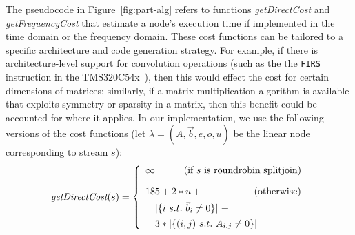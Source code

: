 The pseudocode in Figure~\ref{fig:part-alg} refers to functions {\it
getDirectCost} and {\it getFrequencyCost} that estimate a node's
execution time if implemented in the time domain or the frequency
domain.  These cost functions can be tailored to a specific
architecture and code generation strategy.  For example, if there is
architecture-level support for convolution operations (such as the the
{\tt FIRS} instruction in the TMS320C54x~\cite{ti-dsp-manual}), then
this would effect the cost for certain dimensions of matrices;
similarly, if a matrix multiplication algorithm is available that
exploits symmetry or sparsity in a matrix, then this benefit could be
accounted for where it applies.  In our implementation, we use the
following versions of the cost functions (let
$\lambda=(A,\vec{b},e,o,u)$ be the linear node corresponding to stream
$s$):
\[
\mt{getDirectCost}(s) = \left\{ \begin{array}{l}
\infty ~~~~~~~~~ \mbox{(if }s\mbox{~is roundrobin splitjoin)} \\ ~ \\ \vspace{-14pt} \\
185 + 2*u + ~~~~~~~~~~~~~~~~\mbox{(otherwise)} \\ \vspace{-8pt} ~ \\
~~~|\{ i~s.t.~{\vec b}_i \ne 0 \}|~+ \\ \vspace{-8pt} ~ \\
~~~3 * |\{ (i,j)~s.t.~A_{i,j} \ne 0\}| \\ 
\end{array} \right.
\]
